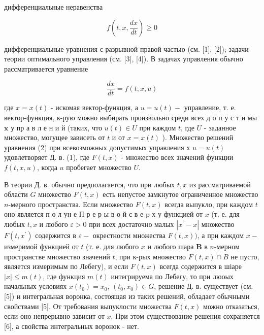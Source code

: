 \documentclass[10pt]{article}
\begin{document}
дифференциальные неравенства



\[

f\left(t, x, \frac{d x}{d t}\right) \geqslant 0

\]



дифференциальные уравнения с разрывной правой частью (см. [1], [2]); задачи теории оптимального управления (см. [3], [4]). В задачах управления обычно рассматривается уравнение



\[

\frac{d x}{d t}=f(t, x, u)

\]



где $x=x(t)$ - искомая вектор-функция, а $u=u(t)-$ управление, т. е. вектор-функция, к-рую можно выбирать произвольно среди всех д о п у с т и мы $\mathbf{x}$ у пр а в л е н и й (таких, что $u(t) \in U$ при каждом $t$, где $U$ - заданное множество, могущее зависеть от $t$ и от $x=x(t)$ ). Множество решений уравнения (2) при всевозможных допустимых управления х $u=u(t)$ удовлетворяет Д. в. (1), где $F(t, x)$ - множество всех значений функции $f(t, x, u)$, когда $u$ пробегает множество $U$.



В теории Д. в. обычно предполагается, что при любых $t, x$ из рассматриваемой области $G$ множество $F(t, x)$ есть непустое замкнутое ограниченное множество $n$-мерного пространства. Если множество $F(t, x)$ всегда выпукло, при каждом $t$ оно является п о л ун е П р е р ы в о й с в е p х у функцией от $x$ (т. е. для любых $t, x$ и любого $\varepsilon>0$ при всех достаточно малых $\left|x^{\prime}-x\right|$ множество $F\left(t, x^{\prime}\right)$ содержится в $\varepsilon-$ окрестности множества $F(t, x))$, а при каждом $x-$ измеримой функцией от $t$ (т. е. для любого $x$ и любого шара $\boldsymbol{B}$ в $n$-мерном пространстве множество значений $t$, при к-рых множество $F(t, x) \cap B$ не пусто, является измеримым по Лебегу), и если $F(t, x)$ всегда содержится в шіаре $|x| \leqslant m(t)$, где функция $m(t)$ интегрируема по Лебегу, то при люоых начальных условиях $x\left(t_{0}\right)=x_{0}$, $\left(t_{0}, x_{0}\right) \in G$, решение Д. в. существует (см. [5]) и интегральная воронка, состоящая из таких решений, обладает обычными свойствами [5]. От требования выпуклости множества $F(t, x)$ можно отказаться, если оно непрерывно зависит от $x$. При этом существование решения сохраняется [6], а свойства интегральных воронок - нет.
\end{document}
